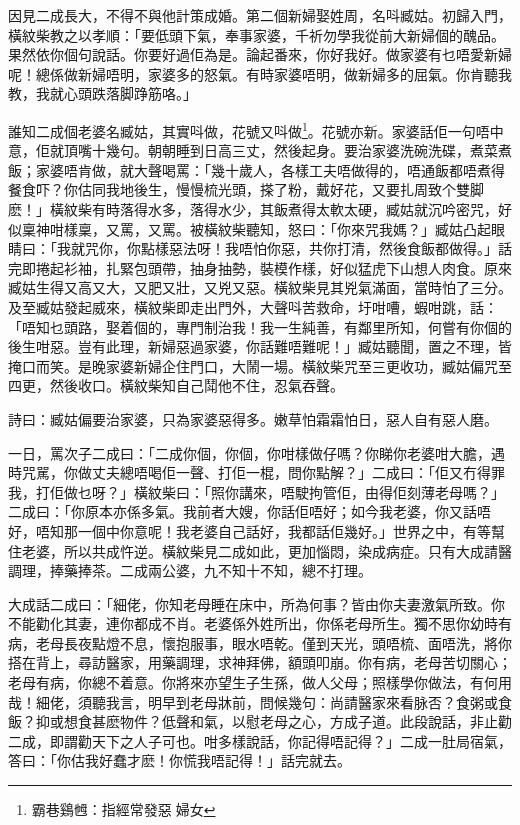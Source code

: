 \documentclass[a5paper, 12pt, openany]{book} %
\begin{document}
	因見二成長大，不得不與他計策成婚。第二個新婦娶姓周，名呌臧姑。初歸入門，橫紋柴教之以孝順：「要低頭下氣，奉事家婆，千祈勿學我從前大新婦個的醜品。果然依你個句說話。你要好過佢為是。論起番來，你好我好。做家婆有乜唔愛新婦呢！總係做新婦唔明，家婆多的怒氣。有時家婆唔明，做新婦多的屈氣。你肯聽我教，我就心頭跌落脚踭筋咯。」

	誰知二成個老婆名臧姑，其實呌做，花號又呌做\footnote{霸巷鷄乸：指經常發惡󱝚婦女}。花號亦新。家婆話佢一句唔中意，佢就頂嘴十幾句。朝朝睡到日高三丈，然後起身。要治家婆洗碗洗碟，煮菜煮飯；家婆唔肯做，就大聲喝罵：「幾十歲人，各樣工夫唔做得的，唔通飯都唔煮得餐食吓？你估同我地後生，慢慢梳光頭，搽了粉，戴好花，又要扎周致个雙脚麽！」橫紋柴有時落得水多，落得水少，其飯煮得太軟太硬，臧姑就沉吟密咒，好似稟神咁樣稟，又罵，又罵。被橫紋柴聽知，怒曰：「你來咒我媽？」臧姑凸起眼睛曰：「我就咒你，你點樣惡法呀！我唔怕你惡，共你打清，然後食飯都做得。」話完即捲起衫袖，扎緊包頭帶，抽身抽勢，裝模作樣，好似猛虎下山想人肉食。原來臧姑生得又高又大，又肥又壯，又兇又惡。橫紋柴見其兇氣滿面，當時怕了三分。及至臧姑發起威來，橫紋柴即走出門外，大聲呌苦救命，圩咁嘈，蝦咁跳，話：「唔知乜頭路，娶着個的，專門制治我！我一生純善，有鄰里所知，何嘗有你個的後生咁惡。豈有此理，新婦惡過家婆，你話難唔難呢！」臧姑聽聞，置之不理，皆掩口而笑。是晚家婆新婦企住門口，大鬧一場。橫紋柴咒至三更收功，臧姑偏咒至四更，然後收口。橫紋柴知自己鬦他不住，忍氣吞聲。

	詩曰：臧姑偏要治家婆，只為家婆惡得多。嫩草怕霜霜怕日，惡人自有惡人磨。

	一日，罵次子二成曰：「二成你個，你個，你咁樣做仔嗎？你睇你老婆咁大膽，遇時咒駡，你做丈夫總唔喝佢一聲、打佢一棍，問你點解？」二成曰：「佢又冇得罪我，打佢做乜呀？」橫紋柴曰：「照你講來，唔駛拘管佢，由得佢刻薄老母嗎？」二成曰：「你原本亦係多氣。我前者大嫂，你話佢唔好；如今我老婆，你又話唔好，唔知那一個中你意呢！我老婆自己話好，我都話佢幾好。」世界之中，有等幫住老婆，所以共成忤逆。橫紋柴見二成如此，更加惱悶，染成病症。只有大成請醫調理，捧藥捧茶。二成兩公婆，九不知十不知，總不打理。

	大成話二成曰：「細佬，你知老母睡在床中，所為何事？皆由你夫妻激氣所致。你不能勸化其妻，連你都成不肖。老婆係外姓所出，你係老母所生。獨不思你幼時有病，老母長夜點燈不息，懷抱服事，眼水唔乾。僅到天光，頭唔梳、面唔洗，將你搭在背上，尋訪醫家，用藥調理，求神拜佛，額頭叩崩。你有病，老母苦切關心；老母有病，你總不着意。你將來亦望生子生孫，做人父母；照樣學你做法，有何用哉！細佬，須聽我言，明早到老母牀前，問候幾句：尚請醫家來看脉否？食粥或食飯？抑或想食甚麽物件？低聲和氣，以慰老母之心，方成子道。此段說話，非止勸二成，即謂勸天下之人子可也。咁多樣說話，你記得唔記得？」二成一肚局宿氣，答曰：「你估我好蠢才麽！你慌我唔記得！」話完就去。
\end{document}
